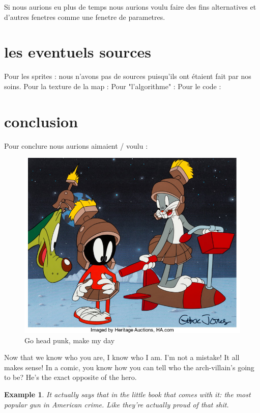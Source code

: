 \documentclass[a4paper, 11pt]{article}
\newtheorem{example}{Example}
\begin{document}
Si nous aurions eu plus de temps nous aurions voulu faire des fins alternatives et d'autres fenetres comme une fenetre de parametres.

\newpage

\section{les eventuels sources}

Pour les sprites : nous n'avons pas de sources puisqu'ils ont étaient fait par nos soins.
Pour la texture de la map :
Pour "l'algorithme" :
Pour le code :

\newpage

\section{conclusion}

Pour conclure nous aurions aimaient / voulu :

\newpage

\begin{figure}[ht!]
 \centering
 \includegraphics[width=0.7\linewidth]{picture.jpg}
 \caption{Go head punk, make my day}
 \label{fig::example::one}
\end{figure}

\begin{multicols}{2}
Now that we know who you are, I know who I am. I'm not a mistake! It all makes sense! In a comic, you know how you can tell who the arch-villain's going to be? He's the exact opposite of the hero.
\begin{example}
It actually says that in the little book that comes with it: the most popular gun in American crime. Like they're actually proud of that shit. 
\end{example}
\end{multicols}
\end{document}
